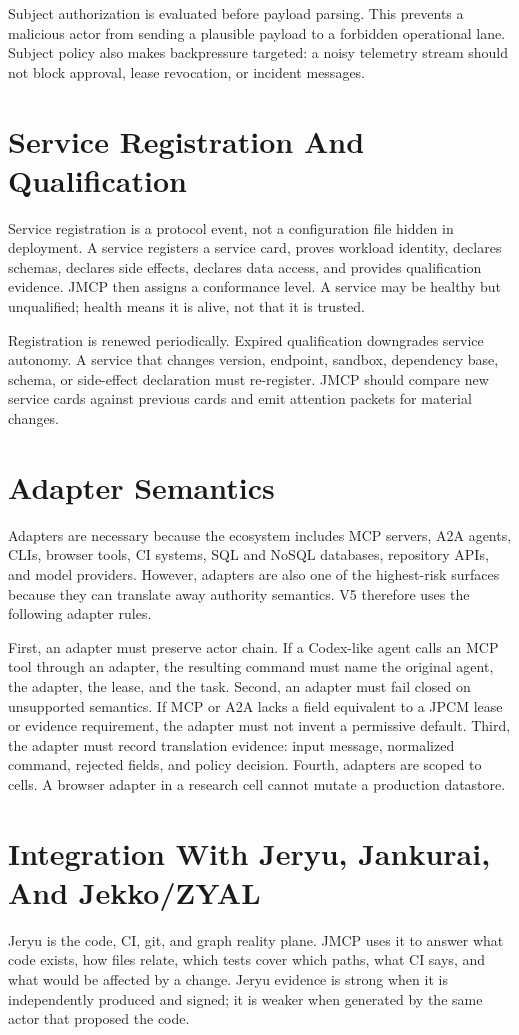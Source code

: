\documentclass[10pt,journal,onecolumn]{IEEEtran}
\begin{document}
Subject authorization is evaluated before payload parsing. This prevents a malicious actor from sending a plausible payload to a forbidden operational lane. Subject policy also makes backpressure targeted: a noisy telemetry stream should not block approval, lease revocation, or incident messages.

\section{Service Registration And Qualification}
Service registration is a protocol event, not a configuration file hidden in deployment. A service registers a service card, proves workload identity, declares schemas, declares side effects, declares data access, and provides qualification evidence. JMCP then assigns a conformance level. A service may be healthy but unqualified; health means it is alive, not that it is trusted.

Registration is renewed periodically. Expired qualification downgrades service autonomy. A service that changes version, endpoint, sandbox, dependency base, schema, or side-effect declaration must re-register. JMCP should compare new service cards against previous cards and emit attention packets for material changes.

\section{Adapter Semantics}
Adapters are necessary because the ecosystem includes MCP servers, A2A agents, CLIs, browser tools, CI systems, SQL and NoSQL databases, repository APIs, and model providers. However, adapters are also one of the highest-risk surfaces because they can translate away authority semantics. V5 therefore uses the following adapter rules.

First, an adapter must preserve actor chain. If a Codex-like agent calls an MCP tool through an adapter, the resulting command must name the original agent, the adapter, the lease, and the task. Second, an adapter must fail closed on unsupported semantics. If MCP or A2A lacks a field equivalent to a JPCM lease or evidence requirement, the adapter must not invent a permissive default. Third, the adapter must record translation evidence: input message, normalized command, rejected fields, and policy decision. Fourth, adapters are scoped to cells. A browser adapter in a research cell cannot mutate a production datastore.

\section{Integration With Jeryu, Jankurai, And Jekko/ZYAL}
Jeryu is the code, CI, git, and graph reality plane. JMCP uses it to answer what code exists, how files relate, which tests cover which paths, what CI says, and what would be affected by a change. Jeryu evidence is strong when it is independently produced and signed; it is weaker when generated by the same actor that proposed the code.
\end{document}
